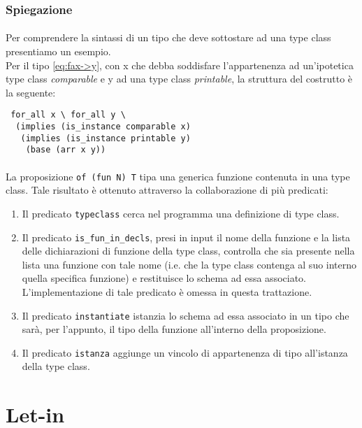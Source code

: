 \documentclass[12pt,a4paper,openright,twoside]{report}
\begin{document}
\subsubsection{Spiegazione}

\paragraph{}
Per comprendere la sintassi di un tipo che deve sottostare ad una type class presentiamo un esempio.\\
Per il tipo \eqref{eq:fax->y}, con x che debba soddisfare l'appartenenza ad un'ipotetica type class \textit{comparable} e y ad una type class \textit{printable}, la struttura del costrutto è la seguente:
\begin{verbatim}
 for_all x \ for_all y \
  (implies (is_instance comparable x)
   (implies (is_instance printable y)
    (base (arr x y))
\end{verbatim}

\paragraph{}
La proposizione \verb"of (fun N) T" tipa una generica funzione contenuta in una type class. Tale risultato è ottenuto attraverso la collaborazione di più predicati:
\begin{enumerate}
 \item Il predicato \verb"typeclass" cerca nel programma una definizione di type class.
 \item Il predicato \verb"is_fun_in_decls", presi in input il nome della funzione e la lista delle dichiarazioni di funzione della type class, controlla che sia presente nella lista una funzione con tale nome (i.e. che la type class contenga al suo interno quella specifica funzione) e restituisce lo schema ad essa associato.\\
 L'implementazione di tale predicato è omessa in questa trattazione.
 \item Il predicato \verb"instantiate" istanzia lo schema ad essa associato in un tipo che sarà, per l'appunto, il tipo della funzione all'interno della proposizione.
 \item Il predicato \verb"istanza" aggiunge un vincolo di appartenenza di tipo all'istanza della type class.
\end{enumerate}

\section{Let-in}
\end{document}
